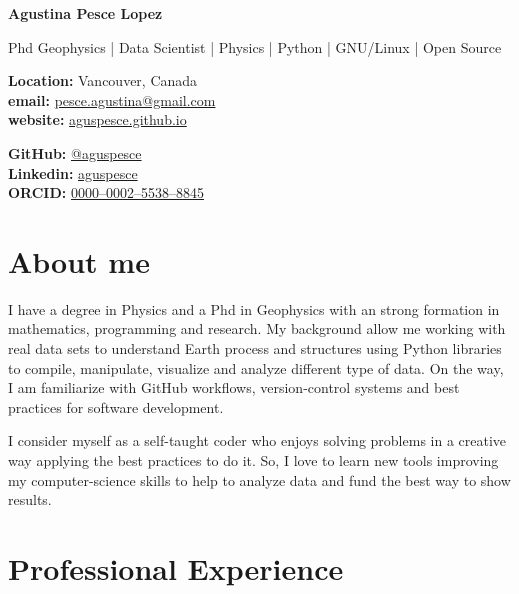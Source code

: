 \documentclass[10pt, a4paper]{article}
\makeatletter
\newcommand{\firstname}{Agustina}
\newcommand{\familyname}{Pesce Lopez}
\newcommand{\email}{pesce.agustina@gmail.com}
\newcommand{\website}{aguspesce.github.io}
\newcommand{\github}{aguspesce}
\newcommand{\linkedin}{aguspesce}
\newcommand{\orcid}{0000--0002--5538--8845}
\newcommand{\fullname}{\firstname{} \familyname}
\newcommand{\maintitle}[1]{
    \begin{center}
        \textbf{\Huge #1}
    \end{center}
}
\newcommand{\subtitle}[1]{
    \begin{center}
        {\large #1}
    \end{center}
}
\newcommand{\affiliation}[1]{
    \begin{center}
        {#1}
    \end{center}
}
\newcommand{\entriespad}{0.75em}
\newcommand{\MAIL}[1]{\href{mailto:#1}{#1}}
\newcommand{\GITHUB}[1]{\href{https://github.com/#1}{@#1}}
\newcommand{\ORCID}[1]{\href{https://orcid.org/#1}{#1}}
\newcommand{\WEBSITE}[1]{\href{https://#1}{#1}}
\newcommand{\LINKEDIN}[1]{\href{https://linkedin.com/in/#1}{#1}}
\makeatother
\begin{document}
\maintitle{\fullname}
\subtitle{Phd Geophysics | Data Scientist | Physics | Python | GNU/Linux | Open
Source}
\vspace{\entriespad}

\begin{minipage}[t]{0.60\linewidth}
    \begin{flushleft}
        \textbf{Location:} Vancouver, Canada
        \\
        \textbf{email:} \MAIL{\email}
        \\
        \textbf{website:} \WEBSITE{\website}
    \end{flushleft}
\end{minipage}
\hfill
\begin{minipage}[t]{0.40\linewidth}
    \begin{flushright}
        \textbf{GitHub:} \GITHUB{\github}
        \\
        \textbf{Linkedin:} \LINKEDIN{\linkedin}
        \\
        \textbf{ORCID:} \ORCID{\orcid}
    \end{flushright}
\end{minipage}

\vspace{\entriespad}


\section{About me}

I have a degree in Physics and a Phd in Geophysics with an strong formation in
mathematics, programming and research.
My background allow me working with real data sets to understand Earth process
and structures using Python libraries to compile, manipulate, visualize and
analyze different type of data.
On the way, I am familiarize with GitHub workflows, version-control systems and
best practices for software development.
\vspace{\entriespad}

I consider myself as a self-taught coder who enjoys solving problems in a
creative way applying the best practices to do it.
So, I love to learn new tools improving my computer-science skills to help to
analyze data and fund the best way to show results.

\section{Professional Experience}
\end{document}
